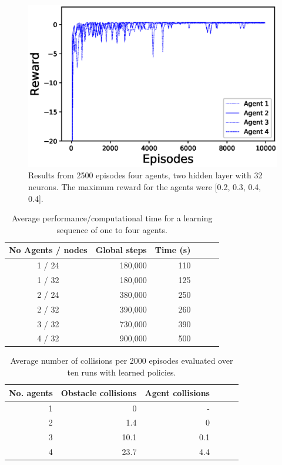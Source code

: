 \documentclass[journal,twoside]{IEEEtran}
\begin{document}
\begin{figure}[!h]
	\centering
	\includegraphics[width=\columnwidth]{4Agent_32n_784243steps}
	\caption{Results from 2500 episodes four agents, two hidden layer with 32 neurons. The maximum reward for the agents were [0.2, 0.3, 0.4, 0.4].}
	\label{4agent32n}    
\end{figure}

\clearpage

\begin{table}[!h]
	\centering
	\caption{Average performance/computational time for a learning sequence of one to four agents.}
	\label{perf}
	\begin{tabular}{crrrrr}
		\hline
		\textbf{No Agents / nodes} & \textbf{Global steps} & \textbf{Time (s) }
		\\ \hline
		1 / 24            & 180,000       & 110       \\ 
		1 / 32            & 180,000       & 125       \\ 
		2 / 24            & 380,000      & 250       \\ 
		2 / 32            & 390,000     & 260      \\ 
		3 / 32            & 730,000     & 390    \\ 
		4 / 32            & 900,000      & 500     \\ 
	\end{tabular}
\end{table}

\begin{table}[!h]
	\centering
	\caption{Average number of collisions per 2000 episodes evaluated over ten runs with learned policies.}
	\label{perf}
	\begin{tabular}{rrrrrr}
		\hline
		\textbf{No. agents}    & \textbf{Obstacle collisions} & \textbf{Agent collisions} \\ \hline
		1            & 0       & -       \\ 
		2            & 1.4       & 0       \\ 
		3            & 10.1      & 0.1       \\ 
		4            & 23.7      & 4.4      \\ 
	\end{tabular}
\end{table}
\end{document}
